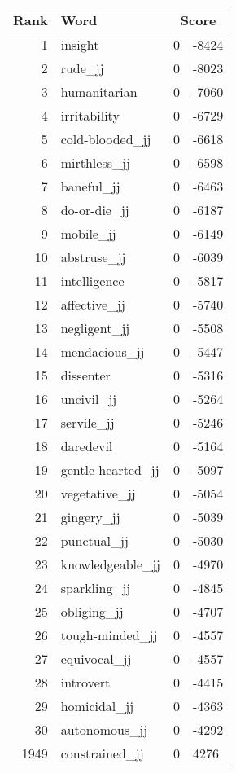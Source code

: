 \begin{longtable}[!htbp]{| rlr@{.}l |}
    \hline
    \textbf{Rank} & \textbf{Word} & \multicolumn{2}{c|}{\textbf{Score}} \\
    \hline
    \endhead
    1 & insight & 0 & -8424 \\
    2 & rude\_jj & 0 & -8023 \\
    3 & humanitarian & 0 & -7060 \\
    4 & irritability & 0 & -6729 \\
    5 & cold-blooded\_jj & 0 & -6618 \\
    6 & mirthless\_jj & 0 & -6598 \\
    7 & baneful\_jj & 0 & -6463 \\
    8 & do-or-die\_jj & 0 & -6187 \\
    9 & mobile\_jj & 0 & -6149 \\
    10 & abstruse\_jj & 0 & -6039 \\
    11 & intelligence & 0 & -5817 \\
    12 & affective\_jj & 0 & -5740 \\
    13 & negligent\_jj & 0 & -5508 \\
    14 & mendacious\_jj & 0 & -5447 \\
    15 & dissenter & 0 & -5316 \\
    16 & uncivil\_jj & 0 & -5264 \\
    17 & servile\_jj & 0 & -5246 \\
    18 & daredevil & 0 & -5164 \\
    19 & gentle-hearted\_jj & 0 & -5097 \\
    20 & vegetative\_jj & 0 & -5054 \\
    21 & gingery\_jj & 0 & -5039 \\
    22 & punctual\_jj & 0 & -5030 \\
    23 & knowledgeable\_jj & 0 & -4970 \\
    24 & sparkling\_jj & 0 & -4845 \\
    25 & obliging\_jj & 0 & -4707 \\
    26 & tough-minded\_jj & 0 & -4557 \\
    27 & equivocal\_jj & 0 & -4557 \\
    28 & introvert & 0 & -4415 \\
    29 & homicidal\_jj & 0 & -4363 \\
    30 & autonomous\_jj & 0 & -4292 \\
    1949 & constrained\_jj & 0 & 4276 \\

\end{longtable}
